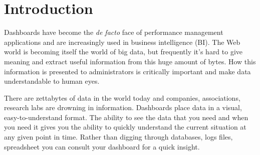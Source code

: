 \documentclass[a4paper,13pt]{report}
\begin{document}

 \tableofcontents

\chapter{Introduction}
Dashboards have become the \emph{de facto}  face of performance management applications and are increasingly used in business intelligence (BI). The Web world  is becoming itself the world of big data, but frequently it's hard to give meaning and extract useful information from this huge amount of bytes. How this information is presented to administrators is critically important and make data understandable to human eyes.\newline

There are zettabytes of data in the world today and companies, associations, research labs are drowning in information. Dashboards place  data in a visual, easy-to-understand format. The ability to see the data that you need and when you need it gives you the ability to quickly understand the current situation at any given point in time. Rather than digging through databases, logs files, spreadsheet you can consult your dashboard for a quick insight.\newline
\end{document}
